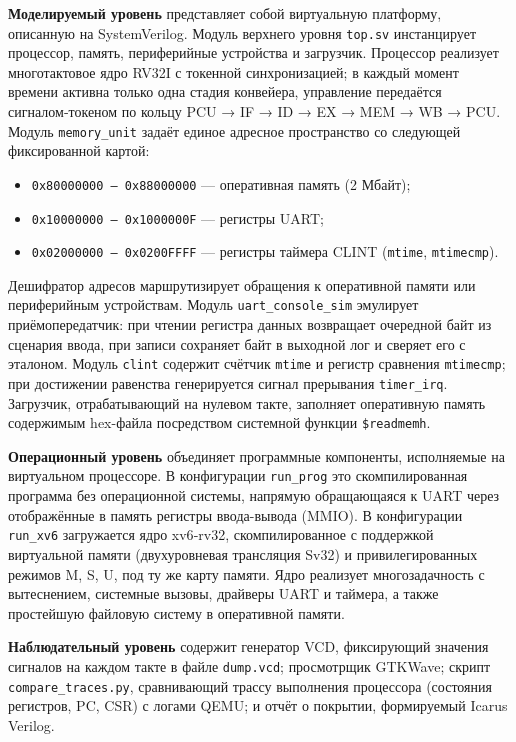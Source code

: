 \textbf{Моделируемый уровень} представляет собой виртуальную платформу, описанную на SystemVerilog. Модуль верхнего уровня \texttt{top.sv} инстанцирует процессор, память, периферийные устройства и загрузчик. Процессор реализует многотактовое ядро RV32I с токенной синхронизацией; в каждый момент времени активна только одна стадия конвейера, управление передаётся сигналом‑токеном по кольцу PCU → IF → ID → EX → MEM → WB → PCU. Модуль \texttt{memory\_unit} задаёт единое адресное пространство со следующей фиксированной картой:
\begin{itemize}
  \item \texttt{0x80000000 -- 0x88000000} --- оперативная память (2 Мбайт);
  \item \texttt{0x10000000 -- 0x1000000F} --- регистры UART;
  \item \texttt{0x02000000 -- 0x0200FFFF} --- регистры таймера CLINT (\texttt{mtime}, \texttt{mtimecmp}).
\end{itemize}
Дешифратор адресов маршрутизирует обращения к оперативной памяти или периферийным устройствам. Модуль \texttt{uart\_console\_sim} эмулирует приёмопередатчик: при чтении регистра данных возвращает очередной байт из сценария ввода, при записи сохраняет байт в выходной лог и сверяет его с эталоном. Модуль \texttt{clint} содержит счётчик \texttt{mtime} и регистр сравнения \texttt{mtimecmp}; при достижении равенства генерируется сигнал прерывания \texttt{timer\_irq}. Загрузчик, отрабатывающий на нулевом такте, заполняет оперативную память содержимым hex-файла посредством системной функции \texttt{\$readmemh}.

\textbf{Операционный уровень} объединяет программные компоненты, исполняемые на виртуальном процессоре. В конфигурации \texttt{run\_prog} это скомпилированная программа без операционной системы, напрямую обращающаяся к UART через отображённые в память регистры ввода-вывода (MMIO). В конфигурации \texttt{run\_xv6} загружается ядро xv6‑rv32, скомпилированное с поддержкой виртуальной памяти (двухуровневая трансляция Sv32) и привилегированных режимов M, S, U, под ту же карту памяти. Ядро реализует многозадачность с вытеснением, системные вызовы, драйверы UART и таймера, а также простейшую файловую систему в оперативной памяти.

\textbf{Наблюдательный уровень} содержит генератор VCD, фиксирующий значения сигналов на каждом такте в файле \texttt{dump.vcd}; просмотрщик GTKWave; скрипт \texttt{compare\_traces.py}, сравнивающий трассу выполнения процессора (состояния регистров, PC, CSR) с логами QEMU; и отчёт о покрытии, формируемый Icarus Verilog.

